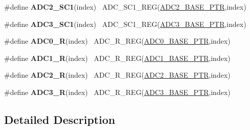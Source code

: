 \begin{DoxyCompactItemize}
\item 
\hypertarget{group___a_d_c___register___accessor___macros_ga47c7e20c28869f2e4b2b132cdd0f506e}{}\#define {\bfseries A\+D\+C2\+\_\+\+S\+C1}(index)                                                ~A\+D\+C\+\_\+\+S\+C1\+\_\+\+R\+E\+G(\hyperlink{group___a_d_c___peripheral_ga13df5f5718b7af0f640ee605db14799e}{A\+D\+C2\+\_\+\+B\+A\+S\+E\+\_\+\+P\+T\+R},index)\label{group___a_d_c___register___accessor___macros_ga47c7e20c28869f2e4b2b132cdd0f506e}

\item 
\hypertarget{group___a_d_c___register___accessor___macros_gabcac7423fbdceb1de90a685db2e9f0de}{}\#define {\bfseries A\+D\+C3\+\_\+\+S\+C1}(index)                                                ~A\+D\+C\+\_\+\+S\+C1\+\_\+\+R\+E\+G(\hyperlink{group___a_d_c___peripheral_gadbd63bcf12f71b0dd3ac6553315dfb0e}{A\+D\+C3\+\_\+\+B\+A\+S\+E\+\_\+\+P\+T\+R},index)\label{group___a_d_c___register___accessor___macros_gabcac7423fbdceb1de90a685db2e9f0de}

\item 
\hypertarget{group___a_d_c___register___accessor___macros_gaa8fc1f5b1e0ab4d1105f4f5b85f50d61}{}\#define {\bfseries A\+D\+C0\+\_\+\+R}(index)                                                    ~A\+D\+C\+\_\+\+R\+\_\+\+R\+E\+G(\hyperlink{group___a_d_c___peripheral_ga6cec2f227a3a37a9fccaa830740f1f5e}{A\+D\+C0\+\_\+\+B\+A\+S\+E\+\_\+\+P\+T\+R},index)\label{group___a_d_c___register___accessor___macros_gaa8fc1f5b1e0ab4d1105f4f5b85f50d61}

\item 
\hypertarget{group___a_d_c___register___accessor___macros_ga4de64c34170dcafcbae5e713a9ca6903}{}\#define {\bfseries A\+D\+C1\+\_\+\+R}(index)                                                    ~A\+D\+C\+\_\+\+R\+\_\+\+R\+E\+G(\hyperlink{group___a_d_c___peripheral_ga7fb56938ede79eea2065c4294db3b2d3}{A\+D\+C1\+\_\+\+B\+A\+S\+E\+\_\+\+P\+T\+R},index)\label{group___a_d_c___register___accessor___macros_ga4de64c34170dcafcbae5e713a9ca6903}

\item 
\hypertarget{group___a_d_c___register___accessor___macros_ga58315b2f13ab99cde119e41619be4981}{}\#define {\bfseries A\+D\+C2\+\_\+\+R}(index)                                                    ~A\+D\+C\+\_\+\+R\+\_\+\+R\+E\+G(\hyperlink{group___a_d_c___peripheral_ga13df5f5718b7af0f640ee605db14799e}{A\+D\+C2\+\_\+\+B\+A\+S\+E\+\_\+\+P\+T\+R},index)\label{group___a_d_c___register___accessor___macros_ga58315b2f13ab99cde119e41619be4981}

\item 
\hypertarget{group___a_d_c___register___accessor___macros_gad0ce2a535d226a36a9522d0049273c0b}{}\#define {\bfseries A\+D\+C3\+\_\+\+R}(index)                                                    ~A\+D\+C\+\_\+\+R\+\_\+\+R\+E\+G(\hyperlink{group___a_d_c___peripheral_gadbd63bcf12f71b0dd3ac6553315dfb0e}{A\+D\+C3\+\_\+\+B\+A\+S\+E\+\_\+\+P\+T\+R},index)\label{group___a_d_c___register___accessor___macros_gad0ce2a535d226a36a9522d0049273c0b}

\end{DoxyCompactItemize}


\subsection{Detailed Description}

